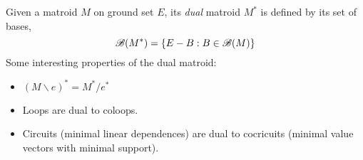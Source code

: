 \begin{definition}
    Given a matroid $M$ on ground set $E$, its \textit{dual} matroid $M^*$ is defined by its set of bases,
    $$\mathscr{B}(M^*) = \{ E - B : B \in \mathscr{B}(M) \}$$
    Some interesting properties of the dual matroid:
    \begin{itemize}
        \item $(M \backslash e )^* = M^* / e^*$
        \item Loops are dual to coloops.
        \item Circuits (minimal linear dependences) are dual to cocricuits (minimal value vectors with minimal support).
    \end{itemize}
\end{definition}
